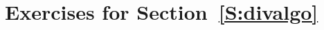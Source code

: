 \section*{Exercises for Section~\ref{S:divalgo}}
\begin{enumerate}
%
%
%

%
%

%
%
%
%
%
%


\end{enumerate}
